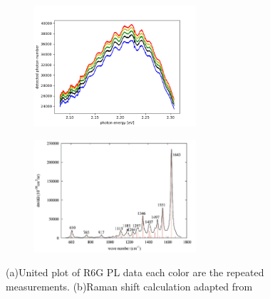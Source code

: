 \documentclass{article}
\begin{document}
 \begin{figure}[ht]
  \centering
  \begin{subfigure}[b]{6cm}
      \centering
      \includegraphics[width=6cm]{../results/R6G_total_fig.png}
      \caption{}
  \end{subfigure}
  \hfill
  \begin{subfigure}[b]{6cm}
      \centering
      \includegraphics[width=6cm]{../results/Raman_shift.png}
      \caption{}
  \end{subfigure}
  \hfill
  \caption{(a)United plot of R6G PL data each color are the repeated measurements. (b)Raman shift calculation adapted from \cite{rhodamine_HOMO_LUMO}}
  \label{fig: R6G total fig}
\end{figure}
\end{document}
